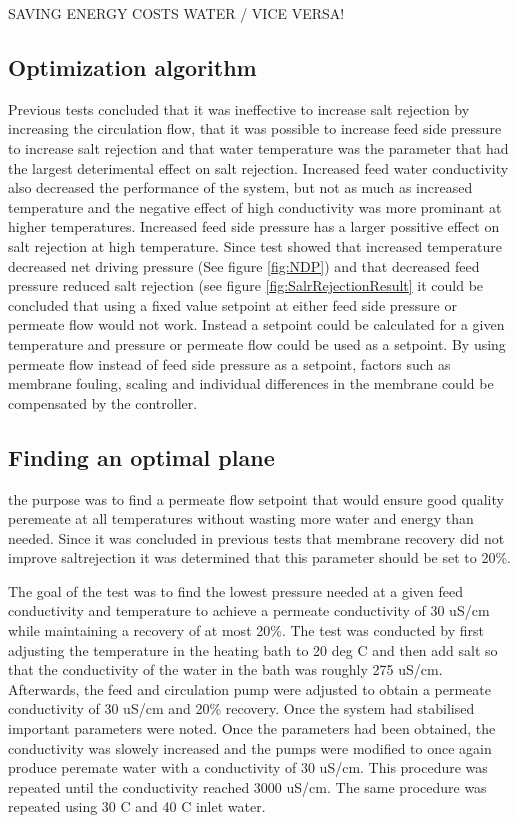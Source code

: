 SAVING ENERGY COSTS WATER / VICE VERSA!


 
\newpage
\subsection{Optimization algorithm}

Previous tests concluded that it was ineffective to increase salt rejection by increasing the circulation flow, that it was possible to increase feed side pressure to increase salt rejection and that water temperature was the parameter that had the largest deterimental effect on salt rejection. Increased feed water conductivity also decreased the performance of the system, but not as much as increased temperature and the negative effect of high conductivity was more prominant at higher temperatures. Increased feed side pressure has a larger possitive effect on salt rejection at high temperature.
Since test showed that increased temperature decreased net driving pressure (See figure \ref{fig:NDP}) and that decreased feed pressure reduced salt rejection (see figure \ref{fig:SalrRejectionResult} it could be concluded that using a fixed value setpoint at either feed side pressure or permeate flow would not work. Instead a setpoint could be calculated for a given temperature and pressure or permeate flow could be used as a setpoint.
By using permeate flow instead of feed side pressure as a setpoint, factors such as membrane fouling, scaling and individual differences in the membrane could be compensated by the controller.

\subsection{Finding an optimal plane}

the purpose was to find a permeate flow setpoint that would ensure good quality peremeate at all temperatures without wasting more water and energy than needed. Since it was concluded in previous tests that membrane recovery did not improve saltrejection it was determined that this parameter should be set to 20\%. 

The goal of the test was to find the lowest pressure needed at a given feed conductivity and temperature to achieve a permeate conductivity of 30 uS/cm while maintaining a recovery of at most 20\%. The test was conducted by first adjusting the temperature in the heating bath to 20 deg C and then add salt so that the conductivity of the water in the bath was roughly 275 uS/cm. Afterwards, the feed and circulation pump were adjusted to obtain a  permeate conductivity of 30 uS/cm and 20\% recovery. Once the system had stabilised important parameters were noted. Once the parameters had been obtained, the conductivity was slowely increased and the pumps were modified to once again produce peremate water with a conductivity of 30 uS/cm. This procedure was repeated until the conductivity reached 3000 uS/cm. The same procedure was repeated using 30 C and 40 C inlet water.



